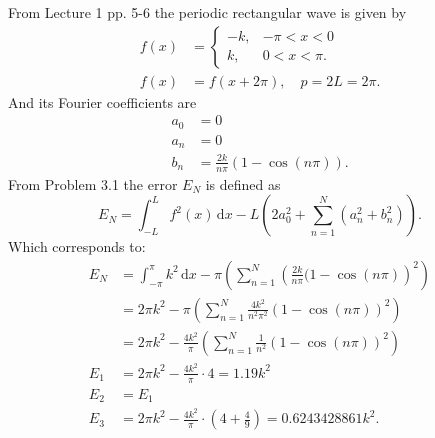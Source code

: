 \begin{derivation}
  From Lecture 1 pp. 5-6 the periodic rectangular wave is given by
  \begin{align*}
    f(x) &= \begin{cases}
      -k, & -\pi < x < 0\\
    k, & 0 < x < \pi
    .\end{cases} \\
      f(x) &= f(x + 2\pi), \quad p = 2L = 2\pi
  .\end{align*}
  And its Fourier coefficients are
  \begin{align*}
    a_0 &= 0 \\
    a_n &= 0 \\
    b_n &= \frac{2k}{n\pi} \left( 1 - \cos(n\pi) \right)
  .\end{align*}
  From Problem 3.1 the error $E_N$ is defined as
  \begin{equation*}
    E_N = \int_{-L}^{L} f^2(x) \, \mathrm{d}x - L \left( 2a_0^2 + \sum_{n = 1}^{N} \left( a_n^2 + b_n^2 \right) \right)
  .\end{equation*}
  Which corresponds to:
  \begin{align*}
    E_N &= \int_{-\pi}^{\pi} k^2 \, \mathrm{d}x - \pi \left( \sum_{n = 1}^{N} \left( \frac{2k}{n\pi}(1 - \cos(n\pi) \right)^2 \right) \\
    &= 2\pi k^2 - \pi  \left( \sum_{n = 1}^{N} \frac{4k^2}{n^2\pi^2} \left( 1 - \cos (n\pi) \right)^2 \right) \\
    &= 2\pi k^2 - \frac{4k^2}{\pi}  \left( \sum_{n = 1}^{N} \frac{1}{n^2} \left( 1 - \cos (n\pi) \right)^2 \right) \\
    E_1 &= 2\pi k^2 - \frac{4k^2}{\pi} \cdot 4 = \num{1,19} k^2 \\
    E_2 &= E_1 \\
    E_3 &= 2 \pi k^2 - \frac{4k^2}{\pi} \cdot \left( 4 + \frac{4}{9} \right) = \num{0,6243428861} k^2
  .\end{align*}
\end{derivation}

